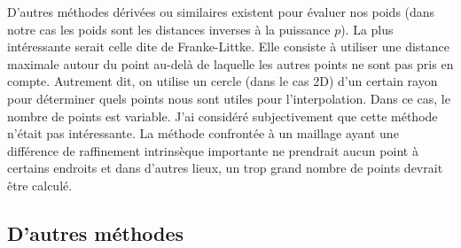 \newpage

D'autres méthodes dérivées ou similaires existent pour évaluer nos poids (dans notre cas les poids sont les distances inverses à la puissance \(p\)). La plus intéressante serait celle dite de Franke-Littke. Elle consiste à utiliser une distance maximale autour du point au-delà de laquelle les autres points ne sont pas pris en compte. Autrement dit, on utilise un cercle (dans le cas 2D) d'un certain rayon pour déterminer quels points nous sont utiles pour l'interpolation. Dans ce cas, le nombre de points est variable.
J'ai considéré subjectivement que cette méthode n'était pas intéressante. La méthode confrontée à un maillage ayant une différence de raffinement intrinsèque importante ne prendrait aucun point à certains endroits et dans d'autres lieux, un trop grand nombre de points devrait être calculé.

\vspace{1 cm}


\subsection{D'autres méthodes}\label{s223}

